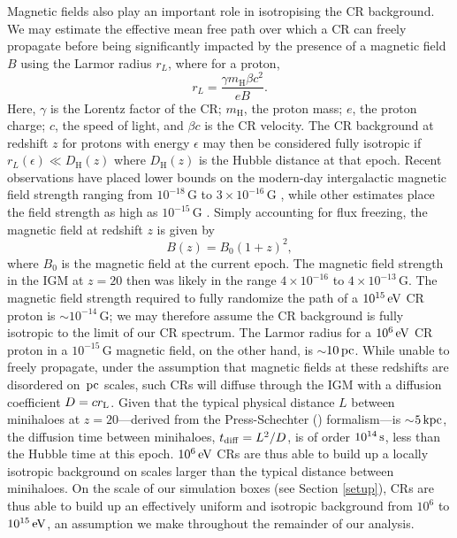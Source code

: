 \documentclass[usenatbib]{mn2e}
\newcommand{\s}{\,{\rm s}}
\newcommand{\pc}{\,{\rm pc}}
\newcommand{\kpc}{\,{\rm kpc}}
\newcommand{\ev}{\,{\rm eV}}
\newcommand{\mh}{m_{\mathrm{H}}}
\newcommand{\Dhubble}{D_{\mathrm{H}}}
\begin{document}
Magnetic fields also play an important role in isotropising the CR background.  
We may estimate the effective mean free path over which a CR can freely propagate before being significantly impacted by the presence of a magnetic field $B$ using the Larmor radius $r_L$, where for a proton, 
\begin{equation}
r_L = \frac{\gamma \mh \beta c^2}{eB}.
\end{equation}
Here, $\gamma$ is the Lorentz factor of the CR; $\mh$, the proton mass; $e$, the proton charge; $c$, the speed of light, and $\beta c$ is the CR velocity. 
The CR background at redshift $z$ for protons with energy $\epsilon$ may then be considered fully isotropic if $r_L(\epsilon) \ll \Dhubble(z)$ where $\Dhubble(z)$ is the Hubble distance at that epoch. 
Recent observations have placed lower bounds on the modern-day intergalactic magnetic field strength ranging from $10^{-18}\,$G \citep{Dermeretal2011} to $3\times10^{-16}\,$G \citep{NeronovVovk2010}, while other estimates place the field strength as high as $10^{-15}\,$G \citep{AndoKusenko2010}.  
Simply accounting for flux freezing, the magnetic field at redshift $z$ is given by
\begin{equation}
B(z) = B_0 (1+z)^2,
\end{equation}
where $B_0$ is the magnetic field at the current epoch. 
The magnetic field strength in the IGM at $z=20$ then was likely in the range $4\times10^{-16}$ to $4\times10^{-13}\,$G.  
The magnetic field strength required to fully randomize the path of a $10^{15}\ev$ CR proton is $\sim$$10^{-14}\,$G; we may therefore assume the CR background is fully isotropic to the limit of our CR spectrum.  
The Larmor radius for a $10^6\ev$ CR proton in a $10^{-15}\,$G magnetic field, on the other hand, is $\sim$$10\pc$.  
While unable to freely propagate, under the assumption that magnetic fields at these redshifts are disordered on $\pc$ scales, such CRs will diffuse through the IGM with a diffusion coefficient $D = c r_{\rm L}$.  
Given that the typical physical distance $L$ between minihaloes at $z=20$---derived from the Press-Schechter (\citeyear{PressSchechter1974}) formalism---is $\sim$$5\kpc$, the diffusion time between minihaloes, $t_{\rm diff} = L^2/D$, is of order $10^{14}\s$, less than the Hubble time at this epoch.
$10^6\ev$ CRs are thus able to build up a locally isotropic background on scales larger than the typical distance between minihaloes.
On the scale of our simulation boxes (see Section \ref{setup}), CRs are thus able to build up an effectively uniform and isotropic background from $10^6$ to $10^{15}\ev$, an assumption we make throughout the remainder of our analysis.
\end{document}
